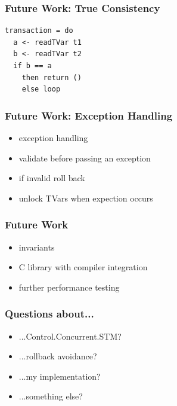 \documentclass{beamer}
\begin{document}
  
 
\begin{frame}[fragile]
\frametitle{Future Work: True Consistency}
\begin{lstlisting}
transaction = do 
  a <- readTVar t1
  b <- readTVar t2
  if b == a 
    then return ()
    else loop
\end{lstlisting}
\end{frame} 
 
 \begin{frame}
  \frametitle{Future Work: Exception Handling}
   \begin{itemize}\setlength\itemsep{1em}
    \item exception handling
    \item validate before passing an exception
    \item if invalid roll back
    \item unlock TVars when expection occurs
   \end{itemize}
  \end{frame}
  
\begin{frame}
 \frametitle{Future Work}
 \begin{itemize}\setlength\itemsep{1em}
  \item invariants 
  \item C library with compiler integration
  \item further performance testing
 \end{itemize}
\end{frame}

 

\begin{frame}
 \frametitle{Questions about...}
 \begin{itemize}\setlength\itemsep{1em}
  \item ...Control.Concurrent.STM?
  \item ...rollback avoidance?
  \item ...my implementation?
  \item ...something else?
\end{itemize}
\end{frame}


  
\end{document}
